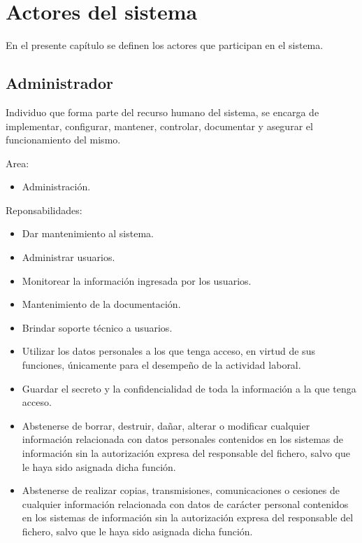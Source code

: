 \chapter{Actores del sistema}
\label{cap:actores}
En el presente capítulo se definen los actores que participan en el sistema.\\


\newpage
\begin{Actor}{\hypertarget{Actor: Administrador}{\section{Administrador}}}{
	Individuo que forma parte del recurso humano del sistema, se encarga de implementar, configurar, mantener, controlar, documentar y asegurar el funcionamiento del mismo.
}
\begin{list}{}{}
    \item[Area:] \ISenter
    \begin{itemize}
		\item Administración.
    \end{itemize}
    \item[Reponsabilidades:] \ISenter
    \begin{itemize}
		\item Dar mantenimiento al sistema.
		\item Administrar usuarios.
		\item Monitorear la información ingresada por los usuarios.
		\item Mantenimiento de la documentación.
		\item Brindar soporte técnico a usuarios.
		\item Utilizar los datos personales a los que tenga acceso, en virtud de sus funciones, únicamente para el desempeño de la actividad laboral.
        \item Guardar el secreto y la confidencialidad de toda la información a la que tenga acceso.
        \item Abstenerse de borrar, destruir, dañar, alterar o modificar cualquier información relacionada con datos personales contenidos en los sistemas de información sin la autorización expresa del responsable del fichero, salvo que le haya sido asignada dicha función.
        \item Abstenerse de realizar copias, transmisiones, comunicaciones o cesiones de cualquier información relacionada con datos de carácter personal contenidos en los sistemas de información sin la autorización expresa del responsable del fichero, salvo que le haya sido asignada dicha función.


\end{itemize}
\end{list}
\end{Actor}
